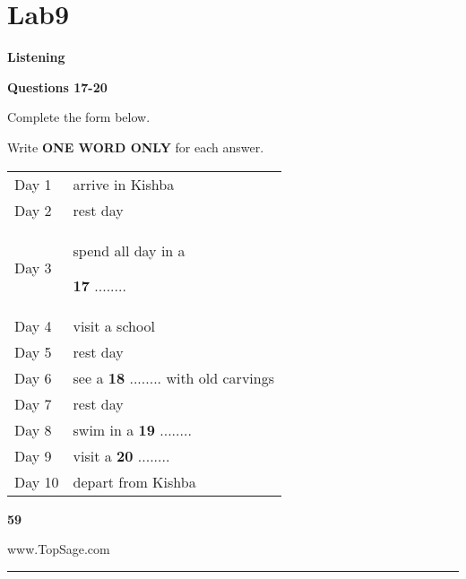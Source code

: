 
\chapter{Lab9}
\setlength{\arrayrulewidth}{0.3mm}
\setlength{\tabcolsep}{18pt}
\renewcommand{\arraystretch}{2.5}

\begin{flushright}
\textbf{Listening}
\end{flushright}


\begin{flushleft}
\textbf{Questions 17-20} \newline

Complete the form below.\newline

Write \textbf{ONE WORD ONLY} for each answer.

\end{flushleft}

\begin{tabularx}{0.8\textwidth} { 
  | >{\raggedright\arraybackslash}X 
  | >{\raggedright\arraybackslash}X | }
   \hline
 \rowcolor{lightgray}\multicolumn{2}{| c |}{ITINERARY}\\
 
  
\hline
 Day 1 & arrive in Kishba  \\
 \hline
 Day 2  & rest day  \\
\hline
 Day 3  & spend all day in a
    
\textbf{17} ........\\
\hline
 Day 4  & visit a school  \\
\hline
 Day 5  & rest day  \\
\hline
 Day 6  & see a \textbf{18} ........ with old
 carvings \\
\hline
 Day 7  & rest day  \\
\hline
 Day 8  & swim in a \textbf{19} ........  \\
\hline
 Day 9  & visit a \textbf{20} ........  \\
\hline
 Day 10  & depart from Kishba  \\
\hline
\end{tabularx}


\begin{flushright}
\textbf{59}
\end{flushright}

\begin{center}
    www.TopSage.com
\end{center}
\noindent\rule{\textwidth}{1pt}









